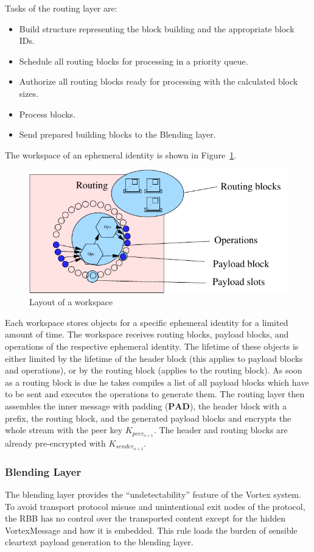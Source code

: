 \documentclass[10pt,journal,compsoc,twocolumn,twoside]{IEEEtran}
\let\MYoriglatexcaption\caption
\renewcommand{\caption}[2][\relax]{\MYoriglatexcaption[#2]{#2}}
\begin{document}
Tasks of the routing layer are:
\begin{itemize}
	\item Build structure representing the block building and the appropriate block IDs.
	\item Schedule all routing blocks for processing in a priority queue.
	\item Authorize all routing blocks ready for processing with the calculated block sizes.
	\item Process blocks.
	\item Send prepared building blocks to the Blending layer.
\end{itemize}

The workspace of an ephemeral identity is shown in Figure~\ref{fig:workspace}.

\begin{figure}[ht]
	\centering\includegraphics[width=0.6\columnwidth]{roughProtocolDesign_workspace}
	\caption{Layout of a workspace}
	\label{fig:workspace}
\end{figure}

Each workspace stores objects for a specific ephemeral identity for a limited amount of time. The workspace receives routing blocks, payload blocks, and operations of the respective ephemeral identity. The lifetime of these objects is either limited by the lifetime of the header block (this applies to payload blocks and operations), or by the routing block (applies to the routing block). As soon as a routing block is due he takes compiles a list of all payload blocks which have to be sent and executes the operations to generate them. The routing layer then assembles the inner message with padding ($\mathbf{PAD}$), the header block with a prefix, the routing block, and the generated payload blocks and encrypts the whole stream with the peer key $K_{peer_{o+1}}$. The header and routing blocks are already pre-encrypted with $K_{sender_{o+1}}$.

\subsubsection{Blending Layer}
The blending layer provides the ``undetectability'' feature of the Vortex system. To avoid transport protocol misuse and unintentional exit nodes of the protocol, the RBB has no control over the transported content except for the hidden VortexMessage and how it is embedded. This rule loads the burden of sensible cleartext payload generation to the blending layer. 
\end{document}
